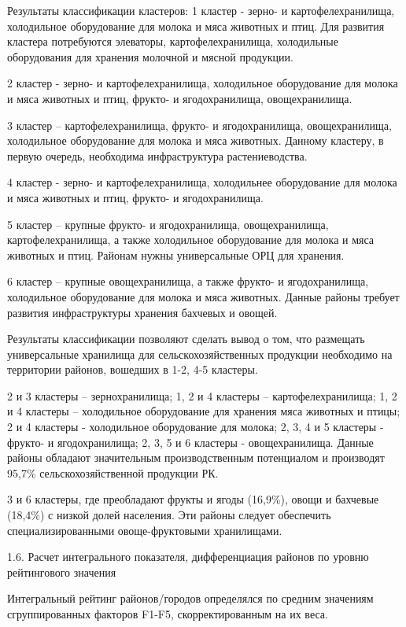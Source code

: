 Результаты классификации кластеров: 1 кластер - зерно- и
картофелехранилища, холодильное оборудование для молока и мяса животных
и птиц. Для развития кластера потребуются элеваторы, картофелехранилища,
холодильные оборудования для хранения молочной и мясной продукции.

2 кластер - зерно- и картофелехранилища, холодильное оборудование для
молока и мяса животных и птиц, фрукто- и ягодохранилища, овощехранилища.

3 кластер -- картофелехранилища, фрукто- и ягодохранилища,
овощехранилища, холодильное оборудование для молока и мяса животных.
Данному кластеру, в первую очередь, необходима инфраструктура
растениеводства.

4 кластер - зерно- и картофелехранилища, холодильнее оборудование для
молока и мяса животных и птиц, фрукто- и ягодохранилища.

5 кластер -- крупные фрукто- и ягодохранилища, овощехранилища,
картофелехранилища, а также холодильное оборудование для молока и мяса
животных и птиц. Районам нужны универсальные ОРЦ для хранения.

6 кластер -- крупные овощехранилища, а также фрукто- и ягодохранилища,
холодильное оборудование для молока и мяса животных. Данные районы
требует развития инфраструктуры хранения бахчевых и овощей.

Результаты классификации позволяют сделать вывод о том, что размещать
универсальные хранилища для сельскохозяйственных продукции необходимо на
территории районов, вошедших в 1-2, 4-5 кластеры.

2 и 3 кластеры -- зернохранилища; 1, 2 и 4 кластеры --
картофелехранилища; 1, 2 и 4 кластеры -- холодильное оборудование для
хранения мяса животных и птицы; 2 и 4 кластеры - холодильное
оборудование для молока; 2, 3, 4 и 5 кластеры - фрукто- и
ягодохранилища; 2, 3, 5 и 6 кластеры - овощехранилища. Данные районы
обладают значительным производственным потенциалом и производят 95,7\%
сельскохозяйственной продукции РК.

3 и 6 кластеры, где преобладают фрукты и ягоды (16,9\%), овощи и
бахчевые (18,4\%) с низкой долей населения. Эти районы следует
обеспечить специализированными овоще-фруктовыми хранилищами.

1.6. Расчет интегрального показателя, дифференциация районов по уровню
рейтингового значения

Интегральный рейтинг районов/городов определялся по средним значениям
сгруппированных факторов F1-F5, скорректированным на их веса.

